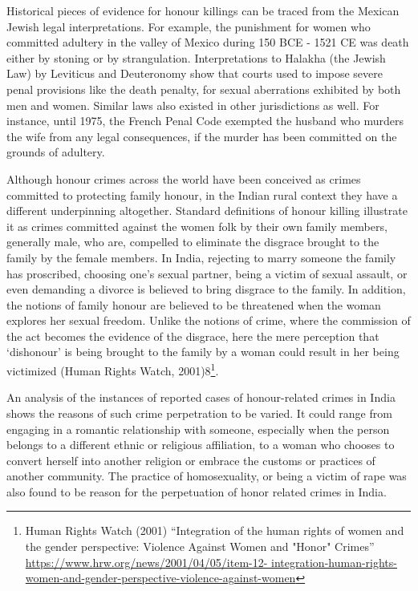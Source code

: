 \begin{multicols}{2}
\noi
Historical pieces of evidence for honour killings can be traced from the Mexican Jewish
legal interpretations. For example, the punishment for women who committed adultery
in the valley of Mexico during 150 BCE - 1521 CE was death either by stoning or by
strangulation. Interpretations to Halakha (the Jewish Law) by Leviticus and
Deuteronomy show that courts used to impose severe penal provisions like the death
penalty, for sexual aberrations exhibited by both men and women. Similar laws also
existed in other jurisdictions as well. For instance, until 1975, the French Penal Code
exempted the husband who murders the wife from any legal consequences, if the
murder has been committed on the grounds of adultery. 



\noi
Although honour crimes across the world have been conceived as crimes committed to
protecting family honour, in the Indian rural context they have a different underpinning
altogether. Standard definitions of honour killing illustrate it as crimes committed
against the women folk by their own family members, generally male, who are,
compelled to eliminate the disgrace brought to the family by the female members. In
India, rejecting to marry someone the family has proscribed, choosing one’s sexual
partner, being a victim of sexual assault, or even demanding a divorce is believed to
bring disgrace to the family. In addition, the notions of family honour are believed to
be threatened when the woman explores her sexual freedom. Unlike the notions of
crime, where the commission of the act becomes the evidence of the disgrace, here the
mere perception that ‘dishonour’ is being brought to the family by a woman could result
in her being victimized (Human Rights Watch, 2001)8\footnote{ Human Rights Watch (2001) “Integration of the human rights of women and the gender perspective:
Violence Against Women and "Honor" Crimes” \url{https://www.hrw.org/news/2001/04/05/item-12-
integration-human-rights-women-and-gender-perspective-violence-against-women}}.

\noi
An analysis of the instances of reported cases of honour-related crimes in India shows
the reasons of such crime perpetration to be varied. It could range from engaging in a
romantic relationship with someone, especially when the person belongs to a different
ethnic or religious affiliation, to a woman who chooses to convert herself into another
religion or embrace the customs or practices of another community. The practice of homosexuality, or being a victim of rape was also found to be reason for the
perpetuation of honor related crimes in India.


\end{multicols}
